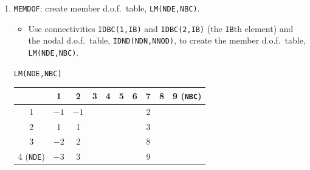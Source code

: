 \begin{enumerate}[leftmargin=*]
  \item \texttt{MEMDOF}: create member d.o.f.\ table, \texttt{LM(NDE,NBC)}.
    \begin{itemize}
      \item Use connectivities \texttt{IDBC(1,IB)} and \texttt{IDBC(2,IB)} (the \texttt{IB}th element) and the nodal d.o.f.\ table, \texttt{IDND(NDN,NNOD)}, to create the member d.o.f.\ table, \texttt{LM(NDE,NBC)}.
    \end{itemize}
    \begin{center}
      \texttt{LM(NDE,NBC)}\\[4pt]
      \begin{tabular}{|c|c|c|c|c|c|c|c|c|c|}\hline
                 & 1    & 2    & 3 & 4 & 5 & 6 & 7 & 8 & 9 (\texttt{NBC})\\\hline
        1        & $-1$ & $-1$ &   &   &   &   & 2 &   & \\\hline
        2        & 1    & 1    &   &   &   &   & 3 &   & \\\hline
        3        & $-2$ & 2    &   &   &   &   & 8 &   & \\\hline
        4 (\texttt{NDE}) & $-3$ & 3 &   &   &   &   & 9 &   & \\\hline
      \end{tabular}
    \end{center}


\end{enumerate}
